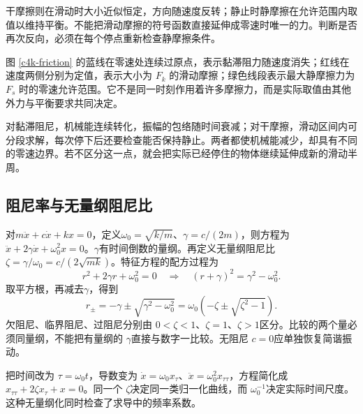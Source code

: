 干摩擦则在滑动时大小近似恒定，方向随速度反转；静止时静摩擦在允许范围内取值以维持平衡。不能把滑动摩擦的符号函数直接延伸成零速时唯一的力。判断是否再次反向，必须在每个停点重新检查静摩擦条件。

图 \ref{c4k-friction} 的蓝线在零速处连续过原点，表示黏滞阻力随速度消失；红线在速度两侧分别为定值，表示大小为 $F_k$ 的滑动摩擦；绿色线段表示最大静摩擦力为 $F_s$ 时的零速允许范围。它不是同一时刻作用着许多摩擦力，而是实际取值由其他外力与平衡要求共同决定。

对黏滞阻尼，机械能连续转化，振幅的包络随时间衰减；对干摩擦，滑动区间内可分段求解，每次停下后还要检查能否保持静止。两者都使机械能减少，却具有不同的零速边界。若不区分这一点，就会把实际已经停住的物体继续延伸成新的滑动半周。

\subsection{阻尼率与无量纲阻尼比}
对$m\ddot x+c\dot x+kx=0$，定义$\omega_0=\sqrt{k/m}$、$\gamma=c/(2m)$，则方程为$\ddot x+2\gamma\dot x+\omega_0^2x=0$。$\gamma$有时间倒数的量纲。再定义无量纲阻尼比$\zeta=\gamma/\omega_0=c/(2\sqrt{mk})$。特征方程的配方过程为
\[
r^2+2\gamma r+\omega_0^2=0
\quad\Longrightarrow\quad(r+\gamma)^2=\gamma^2-\omega_0^2.
\]
取平方根，再减去$\gamma$，得到
\[r_\pm=-\gamma\pm\sqrt{\gamma^2-\omega_0^2}
 =\omega_0(-\zeta\pm\sqrt{\zeta^2-1}).\]
欠阻尼、临界阻尼、过阻尼分别由 $0<\zeta<1$、$\zeta=1$、$\zeta>1$区分。比较的两个量必须同量纲，不能把有量纲的 $\gamma$直接与数字一比较。无阻尼 $c=0$应单独恢复简谐振动。

把时间改为 $\tau=\omega_0t$，导数变为 $\dot x=\omega_0x_\tau$、$\ddot x=\omega_0^2x_{\tau\tau}$，方程简化成 $x_{\tau\tau}+2\zeta x_\tau+x=0$。同一个 $\zeta$决定同一类归一化曲线，而 $\omega_0^{-1}$决定实际时间尺度。这种无量纲化同时检查了求导中的频率系数。




